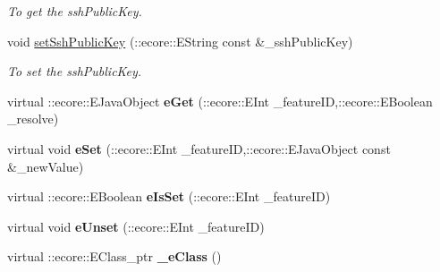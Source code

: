 \begin{DoxyCompactItemize}
\begin{DoxyCompactList}\small\item\em To get the sshPublicKey. \item\end{DoxyCompactList}\item 
void \hyperlink{classUMS__Data_1_1Machine_ad44449767d516be58239686b105fcd22}{setSshPublicKey} (::ecore::EString const \&\_\-sshPublicKey)
\begin{DoxyCompactList}\small\item\em To set the sshPublicKey. \item\end{DoxyCompactList}\item 
\hypertarget{classUMS__Data_1_1Machine_a67b716ca5bb73cba772975119f5ac9e0}{
virtual ::ecore::EJavaObject {\bfseries eGet} (::ecore::EInt \_\-featureID,::ecore::EBoolean \_\-resolve)}
\label{classUMS__Data_1_1Machine_a67b716ca5bb73cba772975119f5ac9e0}

\item 
\hypertarget{classUMS__Data_1_1Machine_a7bb399fc82d1df558fbadc97307fdcf7}{
virtual void {\bfseries eSet} (::ecore::EInt \_\-featureID,::ecore::EJavaObject const \&\_\-newValue)}
\label{classUMS__Data_1_1Machine_a7bb399fc82d1df558fbadc97307fdcf7}

\item 
\hypertarget{classUMS__Data_1_1Machine_a9a9cf5265f05ae852be2250c5bd148ef}{
virtual ::ecore::EBoolean {\bfseries eIsSet} (::ecore::EInt \_\-featureID)}
\label{classUMS__Data_1_1Machine_a9a9cf5265f05ae852be2250c5bd148ef}

\item 
\hypertarget{classUMS__Data_1_1Machine_a75396791c44592b19f5a28d96cb08568}{
virtual void {\bfseries eUnset} (::ecore::EInt \_\-featureID)}
\label{classUMS__Data_1_1Machine_a75396791c44592b19f5a28d96cb08568}

\item 
\hypertarget{classUMS__Data_1_1Machine_a2b5139abd87098c3e4bcc2624a9a2ee8}{
virtual ::ecore::EClass\_\-ptr {\bfseries \_\-eClass} ()}
\label{classUMS__Data_1_1Machine_a2b5139abd87098c3e4bcc2624a9a2ee8}

\end{DoxyCompactItemize}
